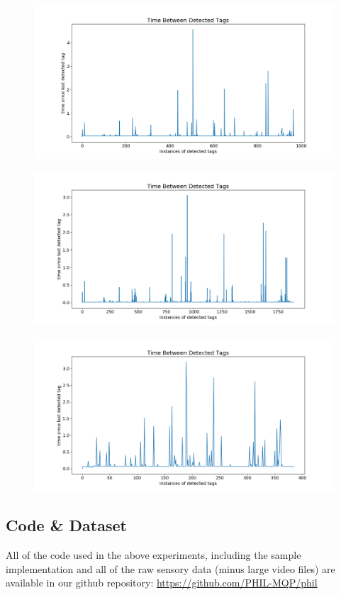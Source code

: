 \documentclass{article}
\begin{document}
    \begin{figure}[H]
      \centering
      \includegraphics[width=1\linewidth]{./images/detection_times_480p30.png}
    \end{figure}
    \begin{figure}[H]
      \centering
      \includegraphics[width=1\linewidth]{./images/detection_times_480p60.png}
    \end{figure}
    \begin{figure}[H]
      \centering
      \includegraphics[width=1\linewidth]{./images/detection_times_1080p15.png}
    \end{figure}

  \subsection{Code \& Dataset}\label{appendix:code}

    All of the code used in the above experiments, including the sample implementation and all of the raw sensory data (minus large video files) are available in our github repository: \url{https://github.com/PHIL-MQP/phil}
\end{document}
